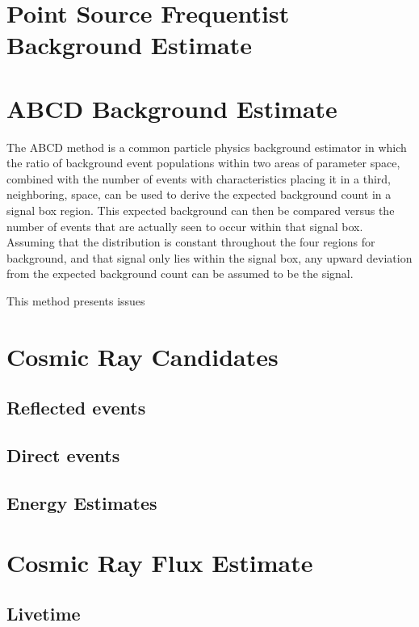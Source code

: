 		
\section{Point Source Frequentist Background Estimate}
	
\section{ABCD Background Estimate}
		The ABCD method is a common particle physics background estimator in which the ratio of background event populations within two areas of parameter space, combined with the number of events with characteristics placing it in a third, neighboring, space, can be used to derive the expected background count in a signal box region.  This expected background can then be compared versus the number of events that are actually seen to occur within that signal box.  Assuming that the distribution is constant throughout the four regions for background, and that signal only lies within the signal box, any upward deviation from the expected background count can be assumed to be the signal.
		
		This method presents issues 
		


\section{Cosmic Ray Candidates}

	\subsection{Reflected events}
	
	\subsection{Direct events}
	
	\subsection{Energy Estimates}


\section{Cosmic Ray Flux Estimate}

	\subsection{Livetime}

